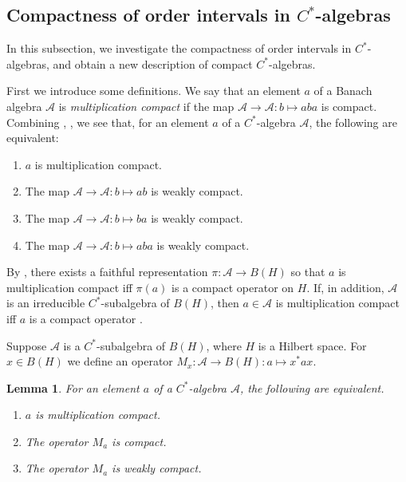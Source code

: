 \documentclass[12pt]{amsart}
\theoremstyle{plain}
\newtheorem{lemma}[theorem]{Lemma}
\theoremstyle{definition}
\newcommand{\A}{\mathcal{A}}
\begin{document}
\subsection{Compactness of order intervals in $C^*$-algebras}
\label{ss:intervals}


In this subsection, we investigate the compactness of order intervals
in $C^*$-algebras, and obtain a new description of compact $C^*$-algebras.

First we introduce some definitions.
We say that an element $a$ of a Banach algebra $\A$
is \emph{multiplication compact}
if the map $\A \to \A : b \mapsto aba$ is compact. Combining
\cite{Yl75PAMS}, \cite{Yl75Suomi}, we see that, for
an element $a$ of a $C^*$-algebra $\A$, the following are equivalent:
\begin{enumerate}
\item
$a$ is multiplication compact.
\item
The map $\A \to \A : b \mapsto ab$ is weakly compact.
\item
The map $\A \to \A : b \mapsto ba$ is weakly compact.
\item
The map $\A \to \A : b \mapsto aba$ is weakly compact.
\end{enumerate}
By \cite{Yl72PAMS}, there exists a faithful representation
$\pi : \A \to B(H)$ so that $a$ is multiplication compact iff
$\pi(a)$ is a compact operator on $H$. If, in addition, $\A$ is
an irreducible $C^*$-subalgebra of $B(H)$, then $a \in \A$
is multiplication compact iff $a$ is a compact operator
\cite{Yl68Suomi}.


Suppose $\A$ is a $C^*$-subalgebra of $B(H)$, where $H$ is a Hilbert space.
For $x \in B(H)$ we define an operator $M_x : \A \to B(H) : a \mapsto x^* a x$.

\begin{lemma}\label{lem:M_a}
For an element $a$ of a $C^*$-algebra $\A$, the following are equivalent.
\begin{enumerate}
\item
$a$ is multiplication compact.
\item
The operator $M_a$ is compact.
\item
The operator $M_a$ is weakly compact.
\end{enumerate}
\end{lemma}
\end{document}
